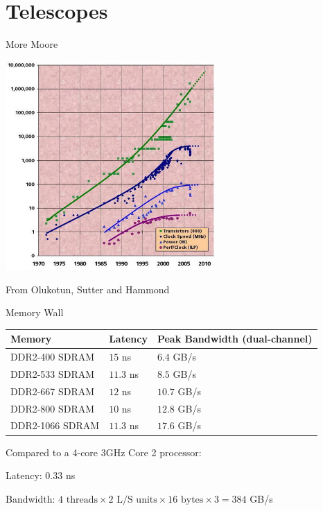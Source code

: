\documentclass[xcolor=dvipsnames,9pt,mathserif]{beamer}
\begin{document}
\section{Telescopes}

\begin{frame}{More Moore}
  \centerline{\includegraphics[width=8cm]{Moores_Law_and_more.jpg}}

  {\footnotesize From Olukotun, Sutter and Hammond}
\end{frame}

\begin{frame}{Memory Wall}
  \begin{center}
    \begin{tabular}{|l|l|l|}
      \hline
      Memory & Latency & Peak Bandwidth (dual-channel) \\
      \hline
      DDR2-400 SDRAM & $15$ ns & $6.4$ GB/s \\
      DDR2-533 SDRAM & $11.3$ ns & $8.5$ GB/s \\
      DDR2-667 SDRAM & $12$ ns & $10.7$ GB/s \\
      DDR2-800 SDRAM & $10$ ns & $12.8$ GB/s \\
      DDR2-1066 SDRAM & $11.3$ ns & $17.6$ GB/s \\
      \hline
    \end{tabular}
  \end{center}

  \bigskip
  Compared to a 4-core 3GHz Core 2 processor:

  \qquad Latency: $0.33$ ns

  \qquad Bandwidth: $4\textrm{ threads}\times 2\textrm{ L/S units}\times 16\textrm{ bytes}\times 3=384$ GB/s
\end{frame}
\end{document}
